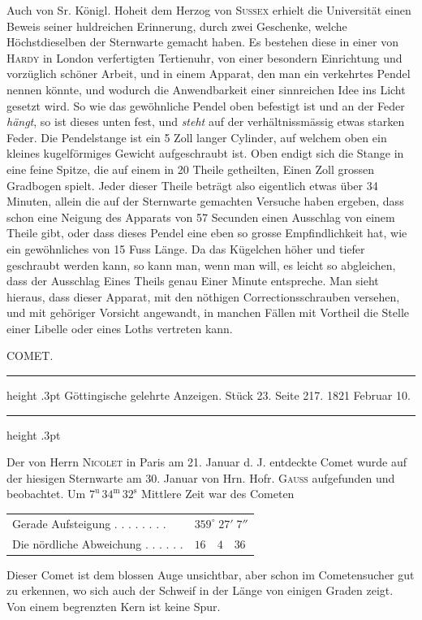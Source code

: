Auch von Sr. Königl. Hoheit dem Herzog von \textsc{Sussex} erhielt die Universität einen
Beweis seiner huldreichen Erinnerung, durch zwei Geschenke, welche Höchstdieselben der
Sternwarte gemacht haben. Es bestehen diese in einer von \textsc{Hardy} in London
verfertigten Tertienuhr, von einer besondern Einrichtung und vorzüglich schöner Arbeit,
und in einem Apparat, den man ein verkehrtes Pendel nennen könnte, und wodurch die
Anwendbarkeit einer sinnreichen Idee ins Licht gesetzt wird. So wie das gewöhnliche
Pendel oben befestigt ist und an der Feder \emph{hängt}, so ist dieses unten fest, und
\emph{steht} auf der verhältnissmässig etwas starken Feder. Die Pendelstange ist ein 5
Zoll langer Cylinder, auf welchem oben ein kleines kugelförmiges Gewicht aufgeschraubt
ist. Oben endigt sich die Stange in eine feine Spitze, die auf einem in 20 Theile
getheilten, Einen Zoll grossen Gradbogen spielt. Jeder dieser Theile beträgt also
eigentlich etwas über 34 Minuten, allein die auf der Sternwarte gemachten Versuche haben
ergeben, dass schon eine Neigung des Apparats von 57 Secunden einen Ausschlag von einem
Theile gibt, oder dass dieses Pendel eine eben so grosse Empfindlichkeit hat, wie ein
gewöhnliches von 15 Fuss Länge. Da das Kügelchen höher und tiefer geschraubt werden
kann, so kann man, wenn man will, es leicht so abgleichen, dass der Ausschlag Eines
Theils genau Einer Minute entspreche. Man sieht hieraus, dass dieser Apparat, mit den
nöthigen Correctionsschrauben versehen, und mit gehöriger Vorsicht angewandt, in manchen
Fällen mit Vortheil die Stelle einer Libelle oder eines Loths vertreten kann.

\par\bigskip
{}
\hypertarget{native-440-part-lower}{}
\begin{center}
{\large COMET.}
\end{center}

\begin{center}\parbox{.86\linewidth}{\centering\small
\hrule height .3pt\relax\vspace{2.5pt}
Göttingische gelehrte Anzeigen. Stück 23. Seite 217. 1821 Februar 10.\par
\vspace{2.5pt}\hrule height .3pt\relax
}\end{center}

Der von Herrn \textsc{Nicolet} in Paris am 21. Januar d. J. entdeckte Comet wurde auf
der hiesigen Sternwarte am 30. Januar von Hrn. Hofr. \textsc{Gauss} aufgefunden und
beobachtet. Um $7^{\mathrm{u}}\,34^{\mathrm{m}}\,32^{\mathrm{s}}$ Mittlere Zeit war des
Cometen

\begin{center}
\begin{tabular}{ll}
Gerade Aufsteigung . . . . . . . . & $359^\circ\;27'\;7''$ \\
Die nördliche Abweichung . . . . . . & $16\quad4\quad36$ \\
\end{tabular}
\end{center}

Dieser Comet ist dem blossen Auge unsichtbar, aber schon im Cometensucher gut zu
erkennen, wo sich auch der Schweif in der Länge von einigen Graden zeigt. Von einem
begrenzten Kern ist keine Spur.
